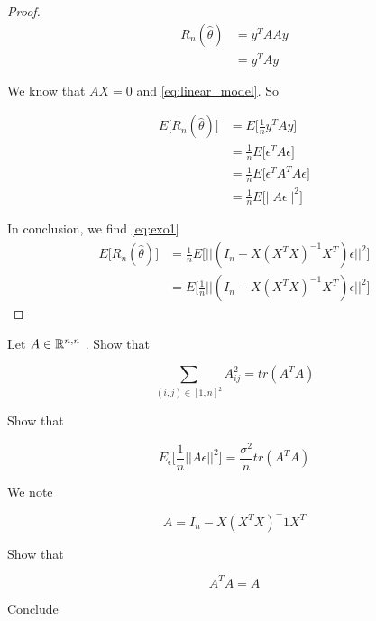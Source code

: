 \begin{proof}
    \begin{align*}
        R_n (\hat{\theta}) &= y ^T A A y \\
            &= y^T A y
    \end{align*}

    We know that $AX = 0$ and \eqref{eq:linear_model}. So

    \begin{align*}
         E \Big[ R_n (\hat{\theta}) \Big] &= E \Big [ \frac{1}{n} y^T A y \Big ] \\
            &= \frac{1}{n}  E \Big [  \epsilon^T A \epsilon \Big ] \\
            &= \frac{1}{n}  E \Big [  \epsilon^T A^T A \epsilon \Big ] \\
            &= \frac{1}{n}  E \Big [  || A \epsilon  ||^2 \Big ]
    \end{align*}

    In conclusion, we find \eqref{eq:exo1}
    \begin{align*}
        E \Big[ R_n (\hat{\theta}) \Big] &= \frac{1}{n}  E \Big [  || (I_n - X (X^T X)^{-1} X^T) \epsilon  ||^2 \Big ] \\
            &= E \Big [ \frac{1}{n}    || (I_n - X (X^T X)^{-1} X^T) \epsilon  ||^2 \Big ]
    \end{align*}
    
\end{proof}


Let $A \in \mathbb{R} ^{n, n}$ . Show that

\begin{equation}
    		\sum_{(i, j)  \in [1, n]^2} A^2_{ij} =  tr(A^T A)
\end{equation}


Show that 

\begin{equation}
    E_\epsilon \Big[ \frac{1}{n} ||A\epsilon ||^2 \Big] = \frac{\sigma^2}{n} tr(A^T A)
\end{equation}


We note

\begin{equation}
    A = I_n - X (X^T X)^-1 X^T
\end{equation}

Show that

\begin{equation}
    A^T A = A
\end{equation}


Conclude